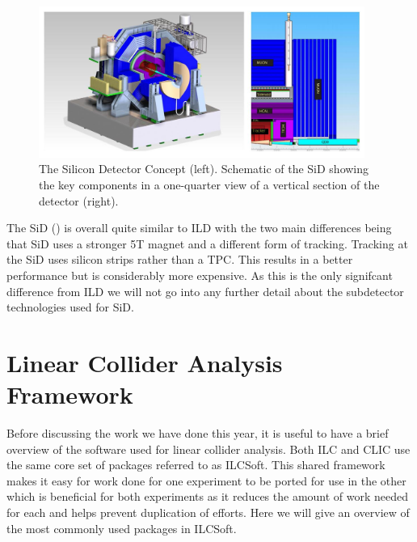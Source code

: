 \begin{figure}
  \centering
  \includegraphics[width=0.95\textwidth,keepaspectratio]{fig/SiD}
  \caption[SiD Detector]{ The Silicon Detector Concept (left). Schematic of the SiD showing the key components in a one-quarter view of a vertical section of the detector (right). \cite{ILCTDR}}
  \label{Fig:SiD}
\end{figure}

The \ac{SiD} () is overall quite similar to ILD with the two main differences being that SiD uses a stronger 5T magnet and a different form of tracking. Tracking at the SiD uses silicon strips rather than a TPC. This results in a better performance but is considerably more expensive. As this is the only signifcant difference from ILD we will not go into any further detail about the subdetector technologies used for SiD.

\chapter{Linear Collider Analysis Framework}

Before discussing the work we have done this year, it is useful to have a brief overview of the software used for linear collider analysis. Both \ac{ILC} and \ac{CLIC} use the same core set of packages referred to as ILCSoft. This shared framework makes it easy for work done for one experiment to be ported for use in the other which is beneficial for both experiments as it reduces the amount of work needed for each and helps prevent duplication of efforts. Here we will give an overview of the most commonly used packages in ILCSoft.

